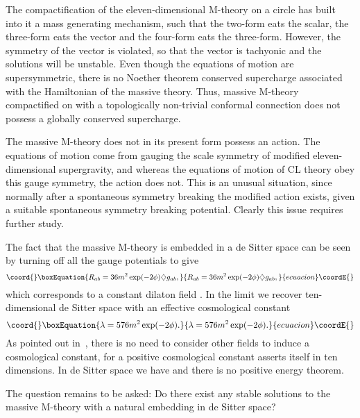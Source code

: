 \documentclass[a4paper,12pt]{article}
\begin{document}
The compactification of the eleven-dimensional M-theory on a circle has
built into it a mass generating mechanism, such that the two-form eats the
scalar, the three-form eats the vector and the four-form eats the
three-form. However, the \coordHE{} symmetry of the vector \coordHE{} is violated,
so that the vector is tachyonic and the solutions will be unstable. Even
though the equations of motion are supersymmetric, there is no Noether
theorem conserved supercharge associated with the Hamiltonian of the
massive theory. Thus, massive M-theory compactified on \coordHE{} with a
topologically non-trivial conformal connection does not possess a globally
conserved supercharge.

The massive M-theory does not in its present form possess an action. The
equations of motion come from gauging the scale symmetry of
modified eleven-dimensional supergravity, and whereas the equations of
motion of CL theory obey this gauge symmetry, the action does not.
This is an unusual situation, since normally after a spontaneous symmetry
breaking the modified action exists, given a suitable spontaneous symmetry
breaking potential. Clearly this issue requires further study.

The fact that the massive M-theory is embedded in a de Sitter
space can be seen by turning off all the gauge potentials to give
\begin{equation}\coord{}\boxEquation{
R_{ab}=36m^2\exp(-2\phi)\diamondsuit g_{ab},
}{
R_{ab}=36m^2\exp(-2\phi)\diamondsuit g_{ab},
}{ecuacion}\coordE{}\end{equation}
which corresponds to a constant dilaton field \myHighlight{$\phi$}\coordHE{}. In the
limit \coordHE{} we recover ten-dimensional de Sitter space with
an effective cosmological constant
\begin{equation}\coord{}\boxEquation{
\lambda=576m^2\exp(-2\phi).
}{
\lambda=576m^2\exp(-2\phi).
}{ecuacion}\coordE{}\end{equation}
As pointed out
in~\cite{Lambert}, there is no need to consider other fields to induce a
cosmological constant, for a positive cosmological constant asserts itself
in ten dimensions. In de Sitter space we have \coordHE{} and there is
no positive energy theorem.

The question remains to be asked: Do there exist any stable solutions to
the massive M-theory with a natural embedding in de Sitter space?
\end{document}
